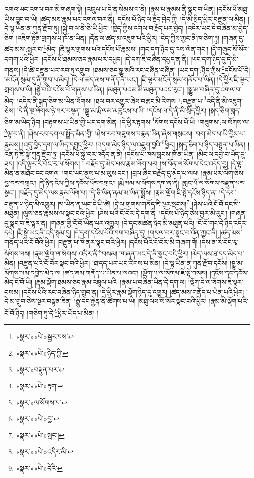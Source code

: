 འགའ་ཡང་འགལ་བར་མི་གཞག་སྟེ། །འཁྲུལ་པ་དེ་ན་སེམས་ལ་ནི། །རྣམ་པ་རྣམས་ནི་སྣང་བ་ཡིན། །དངོས་པོ་མཐུ་ཡིས་བྱུང་བ་ཡི། །ཚད་མས་རྣམ་པར་འགལ་བར་ནི། །དངོས་པོ་ཉིད་ལ་རྗོད་བྱེད་ཀྱི། །དེ་མི་སྲིད་ཕྱིར་བརྫུན་ལ་མིན། །དེ་ལྟ་ཡིན་ན་ཀུན་རྫོབ་ཏུ། །སྐྱེ་བ་ལ་ནི་ཅི་ཡི་ཕྱིར། །ཁྱེད་ཀྱིས་འགལ་བ་རྗོད་པར་བྱེད། །འདིར་ཡང་དེ་བཞིན་མ་བྱེད་ཅིག །འཇིག་རྟེན་གྲགས་པ་ཁོ་ན་ཡིན། །དོན་ལ་ཚད་མ་འཇུག་པའི་ཕྱིར། །ངེད་ཀྱིས་ཀྱང་ནི་ཁ་ཅིག་ཏུ། །གཞན་དུ་ཚད་མས་:སྦྱར་བ་\footnote{«སྣར་»«པེ་»སྦྱར་བས་}མེད། །ཇི་ལྟར་གྲགས་པའི་དངོས་པོ་རྣམས། །གང་དག་ཉིད་དུ་ཁས་ལེན་གང་། །དེ་གཞུང་སོ་སོར་དགག་པའི་ཕྱིར། །དངོས་པོ་ཐམས་ཅད་རྣམ་པར་དཔྱད། །དེ་དག་ཇི་བཞིན་དཔྱད་ན་ནི། །ཡང་དག་ཉིད་དུ་དེ་མི་གནས། །དེ་ཚེ་བརྫུན་པར་རབ་ཏུ་འགྲུབ། །ཐམས་ཅད་སྒྱུ་མའི་རང་བཞིན་བཞིན། །ཡང་དག་:ཉིད་ཀྱིས་\footnote{«སྣར་»«པེ་»ཉིད་ཀྱི་}དངོས་པོ་དེ། །མངོན་སུམ་དུ་ནི་གྲུབ་པ་མེད། །དེ་ལ་ཚད་མས་གནོད་ན་ཡང་། །ཇི་ལྟར་མངོན་སུམ་གནོད་པ་ཡིན། །དེ་ཕྱིར་ཇི་ལྟར་གྲགས་པ་ཡི། །སྐྱེ་བའི་དངོས་པོ་གནས་པ་ཡིན། །མཐུན་པའམ་མི་མཐུན་པའང་རུང་། །སྒྱུ་མ་བཞིན་དུ་འགལ་བ་མེད། །འདིར་ནི་སྐད་ཅིག་མ་ཡིན་སོགས། །ཐལ་བར་འགྱུར་ཞེས་བརྩང་མི་རིགས། །:བརྫུན་པ་\footnote{«སྣར་»བརྫུན་པར་}འདི་ནི་མི་འཇུག་ཅེས། །དེ་ནི་སྔ་ལོགས་ཉེ་བར་བསྟན། །སྒྱུ་མ་རྨི་ལམ་མཚུངས་པ་ཡི། །དངོས་ལ་དེ་ནི་མི་སྲིད་ཕྱིར། །སྐད་ཅིག་སྐད་ཅིག་མ་ཡིད་ཉིད། །བརྟགས་པ་ཡིན་གྱི་ཡང་དག་མིན། །དེ་ཕྱིར་རྟགས་\footnote{«སྣར་»«པེ་»རྟག་}སོགས་དངོས་པོ་ཡི། །གཟུགས་:ལ་སོགས་ལ་\footnote{«སྣར་»ལ་སོགས་པ་}ལྟ་བ་ནི། །ཤེས་རབ་དག་ལ་སྤྱོད་མིན་གྱི། །ཤེས་རབ་གཟུགས་བརྙན་ཡིན་ཞེས་གསུངས། །བག་མེད་པ་ཡི་བྱིས་པ་རྣམས། །འདུ་བྱེད་དག་ལ་ཡིད་དབྱུང་ཕྱིར། །བདག་མེད་ཉིད་ལ་འཇུག་བྱའི་\footnote{«སྣར་»«པེ་»བྱ་}ཕྱིར། །སྐད་ཅིག་པ་ཉིད་བསྟན་པ་ཡིན། །འོན་ཏེ་ཇི་སྟེ་ཀུན་རྫོབ་ཏུ། །དངོས་པོ་སྐྱེ་བར་འདོད་ན་ནི། །དངོས་པོ་ཁས་བླངས་ཁོ་ན་ཡིན། །མིང་ལ་དབྱེ་བ་ཡོད་དུ་ཟད། །འདི་ལྟར་རི་བོང་རྭ་ལ་སོགས། །
བརྗོད་དུ་མེད་ལས་རྣམ་ལོག་པར། །ས་བོན་ལ་སོགས་དེང་འདོད་བྱ། །དེ་ལྟ་མིན་ན་མཐོང་དང་འགལ། །གང་ཡང་ནུས་པ་མ་ལུས་དང་། །བྲལ་ཞིང་བརྗོད་དུ་མེད་པ་ལས། །རྣམ་པར་ལོག་ཅེས་བྱ་བར་བགྲང་། །དེ་ཉིད་ངེས་ཀྱིས་དངོས་པོར་བགྲང་། །རྨི་ལམ་ལ་སོགས་དག་ན་ནི། །གླང་པོ་ལ་སོགས་བརྫུན་པར་སྣང་། །བརྗོད་དུ་མེད་ལས་རྣམ་ལོག་པ། །དེ་ཅི་ཡིན་ནམ་མ་ཡིན་སྨྲོས། །རྣམ་ལྡོག་ཇི་སྟེ་དངོས་ཉིད་ན། །དེ་དག་བརྫུན་པ་ཉིད་མི་འགྱུར། །མ་ཡིན་ན་ཡང་དེ་ཡི་ཚེ། །དེ་ལ་གྲགས་གནོད་ཇི་ལྟར་སྤངས།\footnote{«སྣར་»«པེ་»སྤང་།} །ཤེས་པའི་ངོ་བོ་དང་མི་མཐུན། །ལུས་ཅན་རྣམས་ལ་སྣང་བའི་ཕྱིར། །ཤེས་པའི་ངོ་བོར་དེ་དག་ནི། །དངོས་པོ་ཉིད་ཅེས་བྱར་མི་རུང་། །གཞན་དུ་སྣང་བ་ཇི་ལྟར་ན། །གཞན་གྱི་ངོ་བོ་ཡིན་པར་འགྱུར། །དེ་དང་མཚན་ཉིད་མི་མཐུན་པའི། །ངོ་བོ་གང་དེ་ཉིད་འདིར་དཔེ། །ཇི་སྟེ་ཡང་ནི་འདི་སྙམ་དུ། །དེ་དག་དངོས་པོའི་བག་བཞིན་དུ། །གསལ་བར་སྣང་བ་འོན་ཀྱང་ནི། །ཚད་མས་གནོད་པའི་ངོ་བོའི་ཕྱིར། །བརྫུན་པ་ཁོ་ནར་སྣང་བའི་ཕྱིར། །དངོས་པོའི་ངོ་བོར་མི་གཞག་གོ། །དེས་ན་རི་བོང་རྭ་སོགས་ལས། །རྣམ་ལྡོག་ལ་སོགས་:འདིར་ནི་\footnote{«སྣར་»«པེ་»འདིར་མི་}བསམ། །གཞན་ཡང་དེ་ནི་སྣང་བའི་ཕྱིར། །མེད་ལས་ཐ་དད་མེད་པ་མིན། །བརྫུན་པའི་ངོ་བོར་སྣང་བའི་ཕྱིར། །ཐ་དད་པར་ཡང་རིགས་པ་མིན། །དེ་ལྟ་ཡིན་ན་ཀུན་རྫོབ་དངོས། །སྒྱུ་མ་སོགས་ལས་དབྱེར་མེད་ལ། །ཚད་མས་གནོད་པ་ཡིན་པ་ལའང་། །ལྡོག་པ་ལ་སོགས་ཇི་སྟེ་བསམ། །དངོས་དང་དངོས་མེད་ངོ་བོ་ཡི། །རྣམ་ལྡོག་ཐམས་ཅད་རྣམ་འཁྲུལ་པའི། །རྣམ་པ་བཞིན་ཡིན་དེ་དག་ལ། །ལྡོག་དེ་ལ་སོགས་ཇི་ལྟར་བསམ། །དངོས་པོའི་རང་བཞིན་ཉིད་གྲུབ་ན། །དེ་ཕྱིར་རྣམ་ལྡོག་ཉིད་དུ་འགྱུར། །ཚད་མས་གནོད་པ་ཡིན་པའི་ཕྱིར། །དེ་མ་གྲུབ་ཅེས་སྔར་བསྟན་ཟིན། །རྒྱུ་དང་རྐྱེན་ནི་ཚོགས་པ་ཡི། །མཐུ་ལས་སོ་སོར་སྣང་བའི་ཕྱིར། །རྣམ་མི་ལྡོག་པའི་ངོ་བོ་ཉིད། །གཅིག་ཏུ་དེ་\footnote{«སྣར་»«པེ་»དེའི་}ཕྱིར་ཡོད་པ་མིན། །

